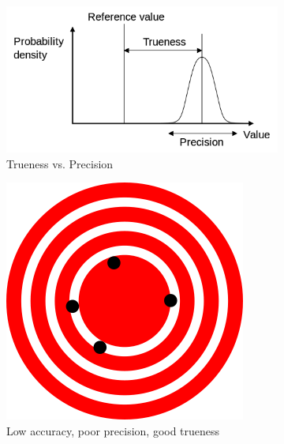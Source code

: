 \begin{figure}[htbp]
 \centering
 \begin{subfigure}[b]{0.5\textwidth}
 \includegraphics[width=\textwidth]{img/trueness_and_precision.png}
 \caption{Trueness vs. Precision}
 \label{sfig:trueness_vs_precision}
 \end{subfigure}
 \begin{subfigure}[b]{0.2\textwidth}
 \includegraphics[width=\textwidth]{img/High_accuracy_Low_precision.png}
 \caption{Low accuracy, poor precision, good trueness}
 \label{sfig:poor_precision}
 \end{subfigure}
 \begin{subfigure}[b]{0.2\textwidth}

\end{subfigure}
\end{figure}
